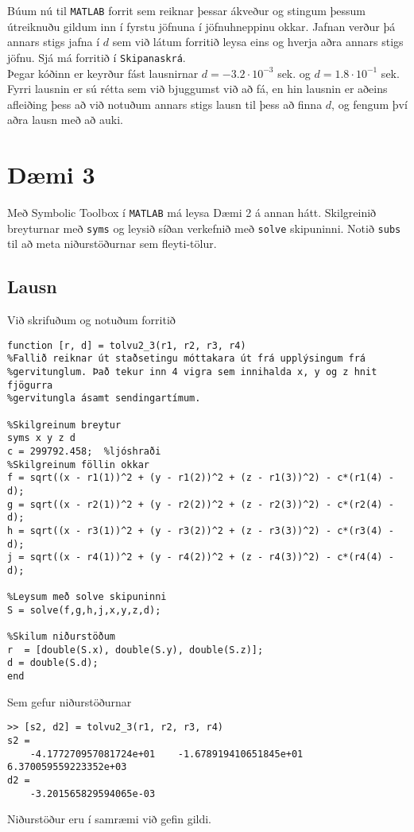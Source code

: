 \documentclass[11pt]{article}
\begin{document}
Búum nú til \texttt{MATLAB} forrit sem reiknar þessar ákveður og stingum þessum útreiknuðu gildum inn í fyrstu jöfnuna í jöfnuhneppinu okkar. Jafnan verður þá annars stigs jafna í $d$ sem við látum forritið leysa eins og hverja aðra annars stigs jöfnu. Sjá má forritið í \texttt{Skipanaskrá}.\\
Þegar kóðinn er keyrður fást lausnirnar $d=-3.2\cdot 10^{-3}$ sek. og $d=1.8\cdot 10^{-1}$ sek. Fyrri lausnin er sú rétta sem við bjuggumst við að fá, en hin lausnin er aðeins afleiðing þess að við notuðum annars stigs lausn til þess að finna $d$, og fengum því aðra lausn með að auki. 

\newpage

\section*{Dæmi 3}
 Með Symbolic Toolbox í \texttt{MATLAB} má leysa Dæmi 2 á annan hátt. Skilgreinið breyturnar með \texttt{syms} og leysið síðan verkefnið með \texttt{solve} skipuninni. Notið \texttt{subs} til að meta niðurstöðurnar sem fleyti-tölur.
  
\subsection*{Lausn}
Við skrifuðum og notuðum forritið
\begin{verbatim}
function [r, d] = tolvu2_3(r1, r2, r3, r4)
%Fallið reiknar út staðsetingu móttakara út frá upplýsingum frá
%gervitunglum. Það tekur inn 4 vigra sem innihalda x, y og z hnit fjögurra
%gervitungla ásamt sendingartímum.

%Skilgreinum breytur
syms x y z d
c = 299792.458;  %ljóshraði
%Skilgreinum föllin okkar
f = sqrt((x - r1(1))^2 + (y - r1(2))^2 + (z - r1(3))^2) - c*(r1(4) - d);
g = sqrt((x - r2(1))^2 + (y - r2(2))^2 + (z - r2(3))^2) - c*(r2(4) - d);
h = sqrt((x - r3(1))^2 + (y - r3(2))^2 + (z - r3(3))^2) - c*(r3(4) - d);
j = sqrt((x - r4(1))^2 + (y - r4(2))^2 + (z - r4(3))^2) - c*(r4(4) - d);

%Leysum með solve skipuninni
S = solve(f,g,h,j,x,y,z,d);

%Skilum niðurstöðum
r  = [double(S.x), double(S.y), double(S.z)];
d = double(S.d);
end
\end{verbatim}
Sem gefur niðurstöðurnar
\begin{verbatim}
>> [s2, d2] = tolvu2_3(r1, r2, r3, r4)
s2 =
    -4.177270957081724e+01    -1.678919410651845e+01     6.370059559223352e+03
d2 =
    -3.201565829594065e-03
\end{verbatim}
Niðurstöður eru í samræmi við gefin gildi.
\end{document}
